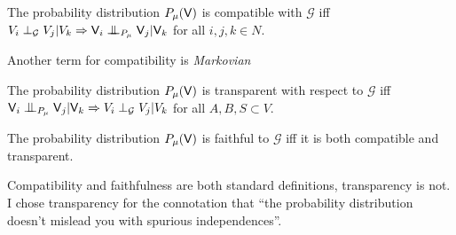 \begin{definition}[Compatibility]\label{def:compatibility}
The probability distribution $P_\mu(\mathsf{V})$ is compatible with $\mathcal{G}$ iff $V_i\perp_{\mathcal{G}} V_j |V_k \Rightarrow \RV{V}_i\CI_{P_\mu} \RV{V}_j | \RV{V}_k$ for all $i,j,k \in N$.

Another term for compatibility is \emph{Markovian}
\end{definition}

\begin{definition}[Transparency]
The probability distribution $P_\mu(\mathsf{V})$ is transparent with respect to $\mathcal{G}$ iff $\RV{V}_i\CI_{P_\mu} \RV{V}_j | \RV{V}_k \Rightarrow V_i\perp_{\mathcal{G}} V_j |V_k$ for all $A,B,S\subset V$.
\end{definition}

\begin{definition}[Faithfulness]\label{def:faithfulness}
The probability distribution $P_\mu(\mathsf{V})$ is faithful to $\mathcal{G}$ iff it is both compatible and transparent.
\end{definition}

\begin{remark}
Compatibility and faithfulness are both standard definitions, transparency is not. I chose transparency for the connotation that ``the probability distribution doesn't mislead you with spurious independences''.
\end{remark}

